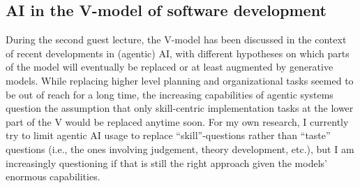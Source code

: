 \documentclass[11pt]{article}
\begin{document}
\subsection{AI in the V-model of software development}
During the second guest lecture, the V-model has been discussed in the context of recent developments in (agentic) AI, with different hypotheses on which parts of the model will eventually be replaced or at least augmented by generative models. While replacing higher level planning and organizational tasks seemed to be out of reach for a long time, the increasing capabilities of agentic systems question the assumption that only skill-centric implementation tasks at the lower part of the V would be replaced anytime soon. For my own research, I currently try to limit agentic AI usage to replace ``skill''-questions rather than ``taste'' questions (i.e., the ones involving judgement, theory development, etc.), but I am increasingly questioning if that is still the right approach given the models' enormous capabilities. 
\end{document}
